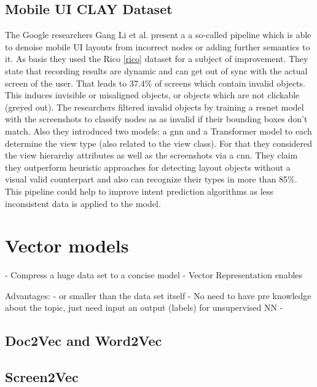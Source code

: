 \subsection{Mobile UI CLAY Dataset}

The Google researchers Gang Li et al. \cite{clay} present a a so-called  pipeline which is able to denoise mobile UI layouts from incorrect nodes or adding further semantics to it.
As basis they used the Rico \ref{rico} dataset for a subject of improvement.
They state that recording results are dynamic and can get out of sync with the actual screen of the user.
That leads to 37.4\% of screens which contain invalid objects.
This induces invisible or misaligned objects, or objects which are not clickable (greyed out).
The researchers filtered invalid objects by training a \gls{resnet} model with the screenshots to classify nodes as as invalid if their bounding boxes don't match.
Also they introduced two models: a \gls{gnn} and a Transformer model to each determine the view type (also related to the view class).
For that they considered the view hierarchy attributes as well as the screenshots via a \gls{cnn}.
They claim they outperform heuristic approaches for detecting layout objects without a visual valid counterpart and also can recognize their types in more than 85\%.
This pipeline could help to improve intent prediction algorithms as less inconsistent data is applied to the model.


\section{Vector models}

- Compress a huge data set to a concise model
- Vector Representation enables

Advantages:
-  or smaller than the data set itself
- No need to have pre knowledge about the topic, just need input an output (labels) for unsupervised NN
-

\subsection{Doc2Vec and Word2Vec}
\cite{le2014distributed}

\subsection{Screen2Vec}
\label{subsec:screen2vec}

